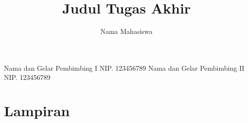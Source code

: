 \documentclass[12pt, a4paper, onecolumn, oneside, final]{report}
\begin{document}

    \title{Judul Tugas Akhir} 	
    \author{Nama Mahasiswa}		%
	\dosbingA%
		{Nama dan Gelar Pembimbing I}%
		{NIP. 123456789}				%
	\dosbingB%
		{Nama dan Gelar Pembimbing II}%
		{NIP. 123456789}				%

    \setcounter{page}{1}

    
    
    

    
    
    
    
    

    \tableofcontents
    \listoffigures
    \listoftables
    

    \renewcommand{\chaptername}{BAB}
    \renewcommand{\thechapter}{\Roman{chapter}}
    \renewcommand\thesection{\arabic{chapter}.\arabic{section}}
    

    \justifying
    
    
    
    
    

    \renewcommand{\bibname}{Daftar Pustaka}
    \printbibliography

    \appendix

    \part*{Lampiran}

    
    
\end{document}
